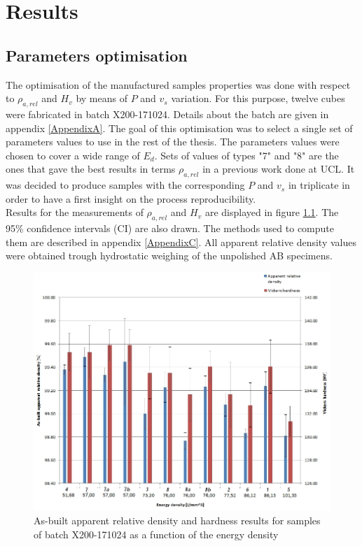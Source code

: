 \chapter{Results}
\label{Chap4}
\section{Parameters optimisation}
\label{Rparaopti}
The optimisation of the manufactured samples properties was done with respect to $\rho_{a,rel}$ and $H_v$  by means of $P$ and $v_s$ variation. For this purpose, twelve cubes were fabricated in batch X200-171024. Details about the batch are given in appendix \ref{AppendixA}. The goal of this optimisation was to select a single set of parameters values to use in the rest of the thesis. The parameters values were chosen to cover a wide range of $E_d$. Sets of values of types "7" and "8" are the ones that gave the best results in terms $\rho_{a,rel}$ in a previous work done at UCL. It was decided to produce samples with the corresponding $P$ and $v_s$ in triplicate in order to have a first insight on the process reproducibility.\\

Results for the measurements of $\rho_{a,rel}$ and $H_v$ are displayed in figure \ref{fig:HD-171024}. The 95\% confidence intervals (CI) are also drawn. The methods used to compute them are described in appendix \ref{AppendixC}. All apparent relative density values were obtained trough hydrostatic weighing of the unpolished AB specimens.\\

\begin{figure}[ht]
\centering
\centerline{\includegraphics[scale=0.62]{Images/HD-171024}}
\decoRule
\caption[As-built apparent relative density and hardness results for samples of batch X200-171024 as a function of the energy density]{As-built apparent relative density and hardness results for samples of batch X200-171024 as a function of the energy density}
\label{fig:HD-171024}
\end{figure} 

